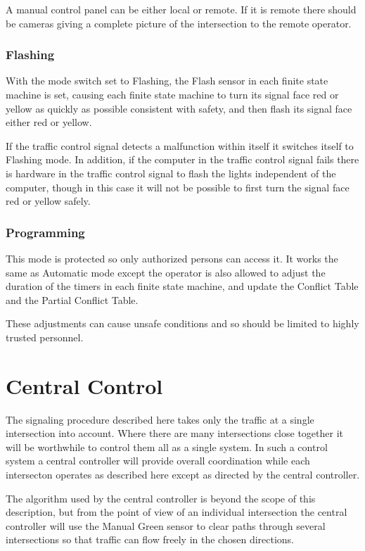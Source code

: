 \documentclass[letterpaper,twoside]{article}
\begin{document}
A manual control panel can be either local or remote.  If it is remote
there should be cameras giving a complete picture of the intersection
to the remote operator.

\subsubsection{Flashing}

With the mode switch set to Flashing, the Flash sensor in each finite state
machine is set, causing each finite state machine to turn its signal face
red or yellow as quickly as possible consistent with safety, and then flash
its signal face either red or yellow.

If the traffic control signal detects a malfunction within itself
it switches itself to Flashing mode.
In addition, if the computer in the traffic
control signal fails there is hardware in the traffic control signal
to flash the lights independent of the computer,
though in this case it will not be possible to first turn the
signal face red or yellow safely.

\subsubsection{Programming}

This mode is protected so only authorized persons can access it.
It works the same as Automatic mode except the operator is also allowed to
adjust the duration of the timers in each finite state machine, and update the
Conflict Table and the Partial Conflict Table.

These adjustments can cause unsafe conditions and so should be limited
to highly trusted personnel.

\section{Central Control}

The signaling procedure described here takes only the traffic at a single
intersection into account.  Where there are many intersections close
together it will be worthwhile to control them all as a single system.
In such a control system a central controller will provide overall
coordination while each intersecton operates as described here except as
directed by the central controller.

The algorithm used by the central controller is beyond the scope of this
description, but from the point of view of an individual intersection
the central controller will use the Manual Green sensor to clear paths
through several intersections so that traffic can flow freely in the
chosen directions.
\end{document}
